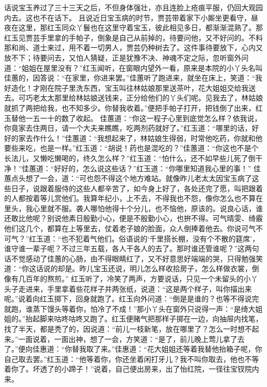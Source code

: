 \documentclass[12pt,oneside]{book}
\begin{document}
话说宝玉养过了三十三天之后，不但身体强壮，亦且连脸上疮痕平服，仍回大观园内去。这也不在话下。
且说近日宝玉病的时节，贾芸带着家下小厮坐更看守，昼夜在这里，那红玉同众丫鬟也在这里守着宝玉，彼此相见多日，都渐渐混熟了。那红玉见贾芸手里拿的手帕子，倒象是自己从前掉的，待要问他，又不好问的。不料那和尚、道士来过，用不着一切男人，贾芸仍种树去了。这件事待要放下，心内又放不下；待要问去，又怕人猜疑，正是犹豫不决、神魂不定之际，忽听窗外问道：“姐姐在屋里没有？”红玉闻听，在窗眼内望外一看，原来是本院的小丫头名叫佳蕙的，因答说：“在家里，你进来罢。”佳蕙听了跑进来，就坐在床上，笑道：“我好造化！才刚在院子里洗东西，宝玉叫往林姑娘那里送茶叶，花大姐姐交给我送去。可巧老太太那里给林姑娘送钱来，正分给他们的丫头们呢。见我去了，林姑娘就抓了两把给我，也不知多少。你替我收着。”便把手帕子打开，把钱倒了出来，红玉替他一五一十的数了收起。
佳蕙道：“你这一程子心里到底觉怎么样？依我说，你竟家去住两日，请一个大夫来瞧瞧，吃两剂药就好了。”红玉道：“哪里的话，好好的家去作什么！”佳蕙道：“我想起来了，林姑娘生得弱，时常他吃药，你就和他要些来吃，也是一样。”红玉道：“胡说！药也是混吃的？”佳蕙道：“你这也不是个长法儿，又懒吃懒喝的，终久怎么样？”红玉道：“怕什么，还不如早些儿死了倒干净！”佳蕙道：“好好的，怎么说这些话？”红玉道：“你哪里知道我心里的事！”
佳蕙点头想了一会，道：“可也怨不得这个地方难站。就像昨儿老太太因宝玉病了这些日子，说跟着服侍的这些人都辛苦了，如今身上好了，各处还完了愿，叫把跟着的人都按着等儿赏他们。我算年纪小，上不去，不得我也不怨，像你怎么也不算在里头，我心里就不服。袭人哪怕他得十个分儿，也不恼他，原该的。说良心话，谁还敢比他呢？别说他素日殷勤小心，便是不殷勤小心，也拚不得。可气晴雯、绮霰他们这几个，都算在上等里去，仗着老子娘的脸面，众人倒捧着他去。你说可气不可气？”红玉道：“也不犯着气他们。俗语说的‘千里搭长棚，没有个不散的筵席’，谁守谁一辈子呢？不过三年五载，各人干各人的去了。那时谁还管谁呢？”这两句话不觉感动了佳蕙的心肠，由不得眼睛红了，又不好意思好端端的哭，只得勉强笑道：“你这话说的却是。昨儿宝玉还说，明儿怎么样收拾房子，怎么样做衣裳，倒像有几百年的熬煎。”
红玉听了，冷笑了两声，方要说话，只见一个未留头的小丫头子走进来，手里拿着些花样子并两张纸，说道：“这是两个样子，叫你描出来呢。”说着向红玉掷下，回身就跑了。红玉向外问道：“倒是是谁的？也等不得说完就跑，谁蒸下馒头等着你，怕冷了不成！”那小丫头在窗外只说得一声：“是绮大姐姐的。”抬起脚来咕咚咕咚又跑了。红玉便赌气把那样子掷在一边，向抽屉内找笔，找了半天，都是秃了的，因说道：“前儿一枝新笔，放在哪里了？怎么一时想不起来。”一面说着，一面出神，想了一会，方笑道：“是了，前儿晚上莺儿拿了去了。”便向佳惠道：“你替我取了来。”佳惠道：“花大姐姐还等着我替他抬箱子呢，你自己取去罢。”红玉道：“他等着你，你还坐着闲打牙儿？我不叫你取去，他也不等着你了。坏透了的小蹄子！”说着，自己便出房来，出了怡红院，一径往宝钗院内来。
\end{document}
